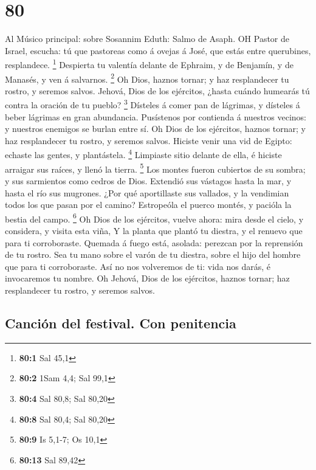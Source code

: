 \hypertarget{section-79}{%
\section{80}\label{section-79}}

 Al Músico principal: sobre Sosannim Eduth: Salmo de Asaph.
OH Pastor de Israel, escucha: tú que pastoreas como á ovejas á José, que
estás entre querubines, resplandece. \footnote{\textbf{80:1} Sal 45,1}
 Despierta tu valentía delante de Ephraim, y de Benjamín, y
de Manasés, y ven á salvarnos. \footnote{\textbf{80:2} 1Sam 4,4; Sal
  99,1}  Oh Dios, haznos tornar; y haz resplandecer tu
rostro, y seremos salvos.  Jehová, Dios de los ejércitos,
¿hasta cuándo humearás tú contra la oración de tu pueblo? \footnote{\textbf{80:4}
  Sal 80,8; Sal 80,20}  Dísteles á comer pan de lágrimas, y
dísteles á beber lágrimas en gran abundancia.  Pusístenos
por contienda á nuestros vecinos: y nuestros enemigos se burlan entre
sí.  Oh Dios de los ejércitos, haznos tornar; y haz
resplandecer tu rostro, y seremos salvos.  Hiciste venir una
vid de Egipto: echaste las gentes, y plantástela. \footnote{\textbf{80:8}
  Sal 80,4; Sal 80,20}  Limpiaste sitio delante de ella, é
hiciste arraigar sus raíces, y llenó la tierra. \footnote{\textbf{80:9}
  Is 5,1-7; Os 10,1}  Los montes fueron cubiertos de su
sombra; y sus sarmientos como cedros de Dios.  Extendió sus
vástagos hasta la mar, y hasta el río sus mugrones.  ¿Por
qué aportillaste sus vallados, y la vendimian todos los que pasan por el
camino?  Estropeóla el puerco montés, y pacióla la bestia
del campo. \footnote{\textbf{80:13} Sal 89,42}  Oh Dios de
los ejércitos, vuelve ahora: mira desde el cielo, y considera, y visita
esta viña,  Y la planta que plantó tu diestra, y el renuevo
que para ti corroboraste.  Quemada á fuego está, asolada:
perezcan por la reprensión de tu rostro.  Sea tu mano sobre
el varón de tu diestra, sobre el hijo del hombre que para ti
corroboraste.  Así no nos volveremos de ti: vida nos darás,
é invocaremos tu nombre.  Oh Jehová, Dios de los ejércitos,
haznos tornar; haz resplandecer tu rostro, y seremos salvos.

\hypertarget{canciuxf3n-del-festival.-con-penitencia}{%
\subsection{Canción del festival. Con
penitencia}\label{canciuxf3n-del-festival.-con-penitencia}}

